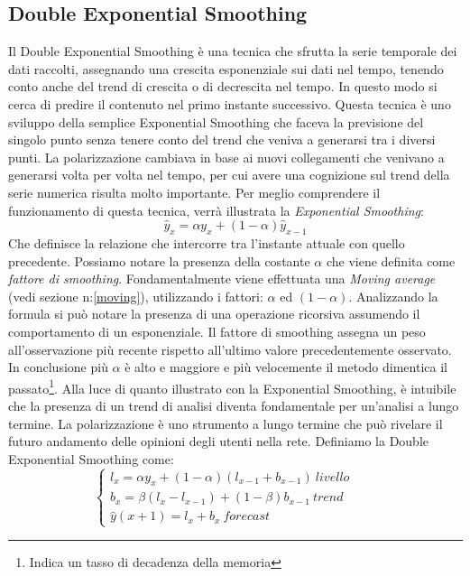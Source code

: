 \subsection{Double Exponential Smoothing}
Il Double Exponential Smoothing è una tecnica che sfrutta la serie temporale dei dati raccolti, assegnando una crescita esponenziale sui dati nel tempo, tenendo conto anche del trend di crescita o di decrescita nel tempo. In questo modo si cerca di predire il contenuto nel primo instante successivo.\cite{DoubleExp}
Questa tecnica è uno sviluppo della semplice Exponential Smoothing che faceva la previsione del singolo punto senza tenere conto del trend che veniva a generarsi tra i diversi punti. 
La polarizzazione cambiava in base ai nuovi collegamenti che venivano a generarsi volta per volta nel tempo, per cui avere una cognizione sul trend della serie numerica risulta molto importante.
Per meglio comprendere il funzionamento di questa tecnica, verrà illustrata la \textit{Exponential Smoothing}:
\begin{equation}\label{singleExp}
\widehat{y}_{x}= \alpha y_{x} + (1-\alpha)\widehat{y}_{x-1}
\end{equation}
Che definisce la relazione che intercorre tra l'instante attuale con quello precedente. Possiamo notare la presenza della costante $\alpha$ che viene definita come \textit{fattore di smoothing}. Fondamentalmente viene effettuata una \textit{Moving average} (vedi sezione n:\ref{moving}), utilizzando i fattori: $\alpha$ ed $(1-\alpha)$.
Analizzando la formula si può notare la presenza di una operazione ricorsiva assumendo il comportamento di un esponenziale.
Il fattore di smoothing assegna un peso all'osservazione più recente rispetto all'ultimo valore precedentemente osservato. In conclusione più $\alpha$ è alto e maggiore e più velocemente il metodo dimentica il passato\footnote{Indica un tasso di decadenza della memoria}.
Alla luce di quanto illustrato con la Exponential Smoothing, è intuibile che la presenza di un trend di analisi diventa fondamentale per un'analisi a lungo termine. La polarizzazione è uno strumento a lungo termine che può rivelare il futuro andamento delle opinioni degli utenti nella rete.
Definiamo la Double Exponential Smoothing come:
\[
\begin{cases}
    l_{x}= \alpha y_{x} +(1-\alpha)(l_{x-1}+ b_{x-1}) \ livello        & \quad \\
    b_{x}= \beta (l_{x}-l_{x-1}) +(1-\beta)b_{x-1}  \ trend        & \quad \\
   \widehat{y}(x+1)=  l_{x} + b_{x} \ forecast    & \quad 
  \end{cases}
\]
